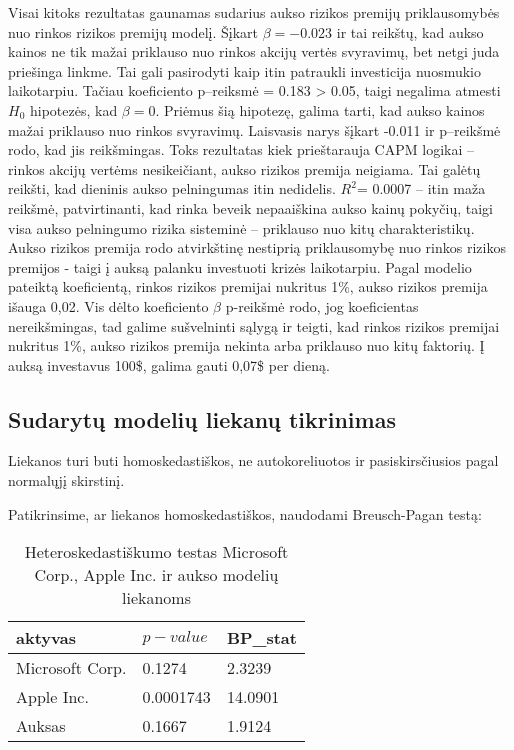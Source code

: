 \documentclass[12pt, a14paper, lithuanian]{article}
\begin{document}
Visai kitoks rezultatas gaunamas sudarius aukso rizikos premijų priklausomybės nuo rinkos rizikos premijų modelį.
Šįkart $\beta=-0.023$ ir tai reikštų, kad aukso kainos ne tik mažai priklauso nuo rinkos akcijų vertės svyravimų,
bet netgi juda priešinga linkme. Tai gali pasirodyti kaip itin patraukli investicija nuosmukio laikotarpiu.
Tačiau koeficiento p--reiksmė = 0.183 > 0.05, taigi negalima atmesti $ H_0 $ hipotezės, kad $\beta=0 $.
Priėmus šią hipotezę, galima tarti, kad aukso kainos mažai priklauso nuo rinkos svyravimų.
Laisvasis narys šįkart -0.011 ir p--reikšmė rodo, kad jis reikšmingas. Toks rezultatas kiek prieštarauja CAPM logikai -- rinkos akcijų vertėms nesikeičiant, aukso rizikos premija neigiama. Tai galėtų reikšti,
kad dieninis aukso pelningumas itin nedidelis.
$ R^2 $= 0.0007 -- itin maža reikšmė, patvirtinanti, kad rinka beveik nepaaiškina aukso kainų pokyčių, taigi 
visa aukso pelningumo rizika sisteminė -- priklauso nuo kitų charakteristikų. \\


Aukso rizikos premija rodo atvirkštinę nestiprią priklausomybę nuo rinkos rizikos premijos - taigi į auksą palanku investuoti krizės laikotarpiu. Pagal modelio pateiktą koeficientą, rinkos rizikos premijai nukritus 1\%, aukso rizikos premija išauga 0,02. Vis dėlto koeficiento $\beta$ p-reikšmė rodo, jog koeficientas nereikšmingas, tad galime sušvelninti sąlygą ir teigti, kad rinkos rizikos premijai nukritus 1\%, aukso rizikos premija nekinta arba priklauso nuo kitų faktorių. Į auksą investavus 100\$, galima gauti 0,07\$ per dieną.



\subsection{Sudarytų modelių liekanų tikrinimas}

Liekanos turi buti homoskedastiškos, ne autokoreliuotos ir pasiskirsčiusios pagal normalųjį skirstinį.

Patikrinsime, ar liekanos homoskedastiškos, naudodami Breusch-Pagan testą:

\begin{table}[ht]
\begin{center}
    \begin{tabular}{ | l | l | l |}
    \hline
    aktyvas  & $ p-value $ & BP_{stat} \\
    \hline
  Microsoft Corp. & 0.1274 & 2.3239\\
	Apple Inc. & 0.0001743 & 14.0901\\
	Auksas &  0.1667 & 1.9124\\
	\hline
    \end{tabular}
\end{center}
\caption{Heteroskedastiškumo testas Microsoft Corp., Apple Inc. ir aukso modelių liekanoms}
\end{table}
\end{document}

